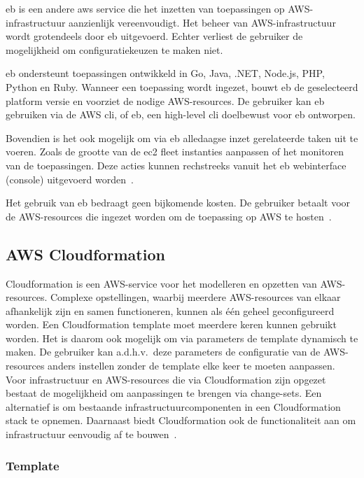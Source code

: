 \acrfull{eb} is een andere \acrshort{aws} service die het inzetten van toepassingen op AWS-infrastructuur aanzienlijk vereenvoudigt.
Het beheer van AWS-infrastructuur wordt grotendeels door \acrshort{eb} uitgevoerd.
Echter verliest de gebruiker de mogelijkheid om configuratiekeuzen te maken niet.

\acrlong{eb} ondersteunt toepassingen ontwikkeld in Go, Java, .NET, Node.js, PHP, Python en Ruby.
Wanneer een toepassing wordt ingezet, bouwt \acrshort{eb} de geselecteerd platform versie en voorziet de nodige AWS-resources.
De gebruiker kan \acrlong{eb} gebruiken via de AWS \acrfull{cli}, of eb, een high-level \acrshort{cli} doelbewust voor \acrlong{eb} ontworpen.

Bovendien is het ook mogelijk om via \acrshort{eb} alledaagse inzet gerelateerde taken uit te voeren.
Zoals de grootte van de \acrshort{ec2} fleet instanties aanpassen of het monitoren van de toepassingen.
Deze acties kunnen rechstreeks vanuit het \acrshort{eb} webinterface (console) uitgevoerd worden~\autocite{Khen2022a}.

Het gebruik van \acrlong{eb} bedraagt geen bijkomende kosten.
De gebruiker betaalt voor de AWS-resources die ingezet worden om de toepassing op AWS te hosten~\autocite{Khen2022a}.

\subsection{AWS Cloudformation}
\label{subsec:service-cloudformation}

Cloudformation is een AWS-service voor het modelleren en opzetten van AWS-resources.
Complexe opstellingen, waarbij meerdere AWS-resources van elkaar afhankelijk zijn en samen functioneren, kunnen als één geheel geconfigureerd worden.
Een Cloudformation template moet meerdere keren kunnen gebruikt worden.
Het is daarom ook mogelijk om via parameters de template dynamisch te maken.
De gebruiker kan a.d.h.v.\ deze parameters de configuratie van de AWS-resources anders instellen zonder de template elke keer te moeten aanpassen.
Voor infrastructuur en AWS-resources die via Cloudformation zijn opgezet bestaat de mogelijkheid om aanpassingen te brengen via change-sets.
Een alternatief is om bestaande infrastructuurcomponenten in een Cloudformation stack te opnemen.
Daarnaast biedt Cloudformation ook de functionaliteit aan om infrastructuur eenvoudig af te bouwen~\autocite{Mansoor2014}.

\subsubsection{Template}

